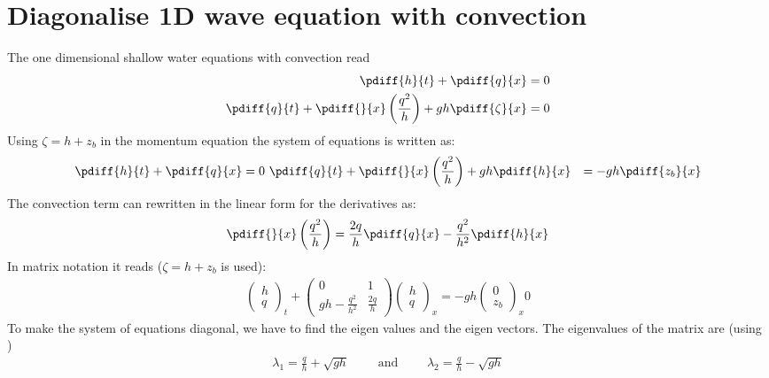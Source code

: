 \chapter{Diagonalise 1D wave equation with convection}\label{sec:diagonalise_conservative_wave_with_convection}

The one dimensional shallow water equations  with convection
read
%
\begin{align}
    \pdiff{h}{t}  + \pdiff{q}{x} & = 0 \label{eq:continuity_for_diagonalisation}\\
    \pdiff{q}{t}  + \pdiff{}{x} \left( \frac{q^2}{h} \right) + g h \pdiff{\zeta}{x} & = 0 \label{eq:momentum_for_diagonalisation}
\end{align}
Using $\zeta = h +z_b$ in the momentum equation the system of equations is written as:
\begin{align}
    \pdiff{h}{t}  + \pdiff{q}{x} & = 0 \
    \pdiff{q}{t}  + \pdiff{}{x} \left( \frac{q^2}{h} \right) + g h \pdiff{h}{x} & = -gh\pdiff{z_b}{x}
\end{align}
The convection term can rewritten in the linear form for the derivatives as:
\begin{align}
    \pdiff{}{x} \left( \frac{q^2}{h} \right) = \frac{2 q}{h} \pdiff{q}{x} - \frac{q^2}{h^2}\pdiff{h}{x}
    \label{eq:convection_linear_form}
\end{align}
In matrix notation it reads ($\zeta = h +z_b$ is used):
\begin{align}
    \begin{pmatrix} h \\ q \end{pmatrix}_t +
    \begin{pmatrix} 0 & 1  \\ gh-\frac{q^2}{h^2} & \frac{2q}{h} \end{pmatrix} 
    \begin{pmatrix} h \\ q \end{pmatrix}_x = 
    -gh \begin{pmatrix} 0 \\ z_b \end{pmatrix}_x
    0
\end{align}
To make the system of equations diagonal, we have to find the eigen values and the eigen vectors.
The eigenvalues of the matrix are (using \maplesoft)
\begin{align}
    \lambda_1 = \frac{q}{h} + \sqrt{gh} \qquad \mbox{ and } \qquad
    \lambda_2 = \frac{q}{h} - \sqrt{gh}
\end{align}
